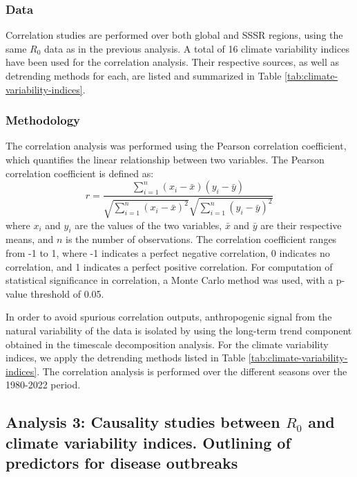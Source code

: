 \documentclass[fleqn,10pt]{wlscirep}
\begin{document}
  \subsubsection{Data} \label{sec-methods-2-data}

  Correlation studies are performed over both global and SSSR regions, using the same $R_0$ data as in the previous analysis. A total of 16 climate variability indices have been used for the correlation analysis. Their respective sources, as well as detrending methods for each, are listed and summarized in Table \ref{tab:climate-variability-indices}.

  \subsubsection{Methodology} \label{sec-methods-2-methodology}

  The correlation analysis was performed using the Pearson correlation coefficient, which quantifies the linear relationship between two variables. The Pearson correlation coefficient is defined as:
  \begin{equation}
      r = \frac{\sum_{i=1}^{n} (x_i - \bar{x})(y_i - \bar{y})}{\sqrt{\sum_{i=1}^{n} (x_i - \bar{x})^2} \sqrt{\sum_{i=1}^{n} (y_i - \bar{y})^2}}
  \end{equation}
  where $x_i$ and $y_i$ are the values of the two variables, $\bar{x}$ and $\bar{y}$ are their respective means, and $n$ is the number of observations. The correlation coefficient ranges from -1 to 1, where -1 indicates a perfect negative correlation, 0 indicates no correlation, and 1 indicates a perfect positive correlation. For computation of statistical significance in correlation, a Monte Carlo method was used, with a p-value threshold of 0.05.

  In order to avoid spurious correlation outputs, anthropogenic signal from the natural variability of the data is isolated by using the long-term trend component obtained in the timescale decomposition analysis. For the climate variability indices, we apply the detrending methods listed in Table \ref{tab:climate-variability-indices}. The correlation analysis is performed over the different seasons over the 1980-2022 period.

  \subsection{Analysis 3: Causality studies between $R_0$ and climate variability indices. Outlining of predictors for disease outbreaks} \label{sec-methods-3}
\end{document}
